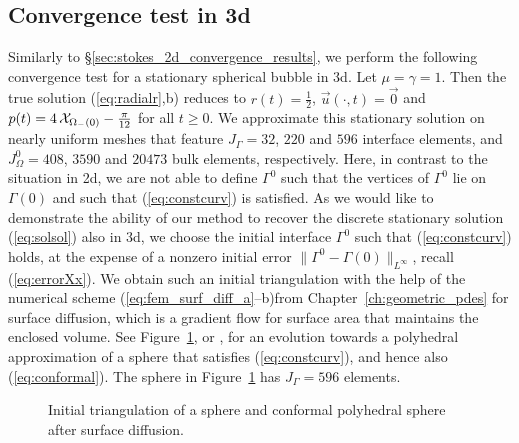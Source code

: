 \subsection{Convergence test in 3d} \label{sec:stokes_3d_convergence_results}
Similarly to \S\ref{sec:stokes_2d_convergence_results}, we perform the following
convergence test for a stationary spherical bubble in 3d. Let $\mu = \gamma =
1$. Then the true solution (\ref{eq:radialr},b) reduces to $r(t) =
\frac{1}{2}$, $\vec u(\cdot, t) = \vec 0$ and $p(t) = 4\,\mathrm{\mathcal{X}}_{\Omega_-(0)}
- \frac{\pi}{12}$ for all $t\geq0$. We approximate this stationary solution on
nearly uniform meshes that feature $J_\Gamma = 32$, $220$ and $596$ interface
elements, and $J_\Omega^0 = 408$, $3590$ and $20473$ bulk elements,
respectively. Here, in contrast to the situation in 2d, we are not able to
define $\Gamma^0$ such that the vertices of $\Gamma^0$ lie on $\Gamma(0)$ and
such that (\ref{eq:constcurv}) is satisfied. As we would like to demonstrate
the ability of our method to recover the discrete stationary solution
(\ref{eq:solsol}) also in 3d, we choose the initial interface $\Gamma^0$ such
that (\ref{eq:constcurv}) holds, at the expense of a nonzero initial error
$\| \Gamma^0 - \Gamma(0) \|_{L^\infty}$, recall (\ref{eq:errorXx}). We obtain
such an initial triangulation with the help of the numerical scheme
(\ref{eq:fem_surf_diff_a}--b)from Chapter~\ref{ch:geometric_pdes} for surface
diffusion, which is a gradient flow for surface area that maintains the
enclosed volume. See Figure~\ref{fig:conformal_sphere}, or
\cite[Fig. 11]{gflows3d}, for an evolution towards a polyhedral approximation
of a sphere that satisfies (\ref{eq:constcurv}), and hence also
(\ref{eq:conformal}). The sphere in Figure~\ref{fig:conformal_sphere} has
$J_\Gamma = 596$ elements.
\begin{figure}[htbp]
\centering
{}
\caption[Conformal polyhedral sphere triangulation]{Initial triangulation of
a sphere and conformal polyhedral sphere after surface diffusion.}
\label{fig:conformal_sphere}
\end{figure}

